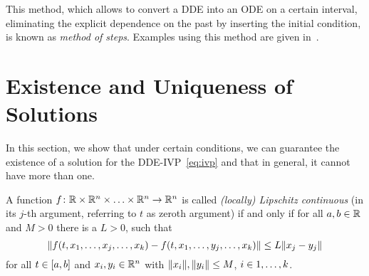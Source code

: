     This method, which allows to convert a DDE into an ODE on a certain interval, eliminating the explicit dependence on the past by inserting the initial condition, is known as \emph{method of steps}.
    Examples using this method are given in~\cite{Falbo06FDEs}.




\section{Existence and Uniqueness of Solutions}
    \label{solutions-existence-uniqueness}


    In this section, we show that under certain conditions, we can guarantee the existence of a solution for the DDE-IVP~\eqref{eq:ivp} and that in general, it cannot have more than one.


    \begin{definition}\label{def:lipschitz}
        A function $f\colon\mathbb{R}\times\mathbb{R}^n\times\ldots\times\mathbb{R}^n\to\mathbb{R}^n$ is called \emph{(locally) Lipschitz continuous} (in its $j$-th argument, referring to $t$ as zeroth argument) if and only if for all $a,b\in\mathbb{R}$ and $M>0$ there is a $L>0$, such that
        \begin{equation*}
            \nnorm*{f(t,x_1,\ldots,x_j,\ldots,x_k) - f(t,x_1,\ldots,y_j,\ldots,x_k)} \leq L\nnorm*{x_j-y_j}
        \end{equation*}
        for all $t\in[a,b]$ and $x_i,y_i\in\mathbb{R}^n$ with $\lVert x_i\rVert,\lVert y_i\rVert\leq M$, $i\in1,\ldots,k$.
    \end{definition}


